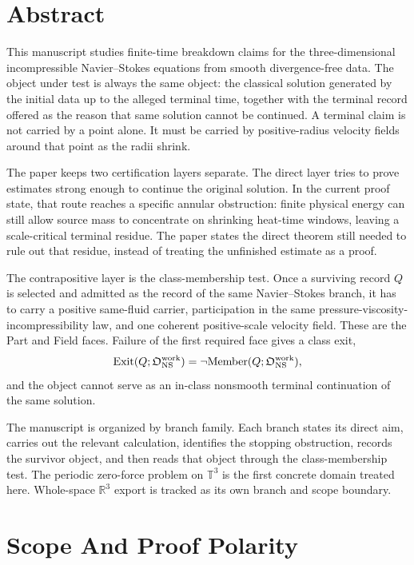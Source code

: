 \section*{Abstract}

This manuscript studies finite-time breakdown claims for the three-dimensional
incompressible Navier--Stokes equations from smooth divergence-free data.  The
object under test is always the same object: the classical solution generated by
the initial data up to the alleged terminal time, together with the terminal
record offered as the reason that same solution cannot be continued.  A terminal
claim is not carried by a point alone.  It must be carried by positive-radius
velocity fields around that point as the radii shrink.

The paper keeps two certification layers separate.  The direct layer tries to
prove estimates strong enough to continue the original solution.  In the current
proof state, that route reaches a specific annular obstruction: finite physical
energy can still allow source mass to concentrate on shrinking heat-time windows,
leaving a scale-critical terminal residue.  The paper states the direct theorem
still needed to rule out that residue, instead of treating the unfinished
estimate as a proof.

The contrapositive layer is the class-membership test.  Once a surviving record
\(Q\) is selected and admitted as the record of the same Navier--Stokes branch,
it has to carry a positive same-fluid carrier, participation in the same
pressure-viscosity-incompressibility law, and one coherent positive-scale
velocity field.  These are the Part and Field faces.  Failure of the
first required face gives a class exit,
\[
  \mathrm{Exit}(Q;\mathfrak O_{\mathrm{NS}}^{\mathrm{work}})=
  \neg\mathrm{Member}(Q;\mathfrak O_{\mathrm{NS}}^{\mathrm{work}}),
\]
and the object cannot serve as an in-class nonsmooth terminal continuation of
the same solution.

The manuscript is organized by branch family.  Each branch states its direct
aim, carries out the relevant calculation, identifies the stopping obstruction,
records the survivor object, and then reads that object through the
class-membership test.  The periodic zero-force problem on \(\mathbb T^3\) is
the first concrete domain treated here.  Whole-space \(\mathbb R^3\) export is
tracked as its own branch and scope boundary.

\section{Scope And Proof Polarity}
\label{sec:scope-proof-polarity}

